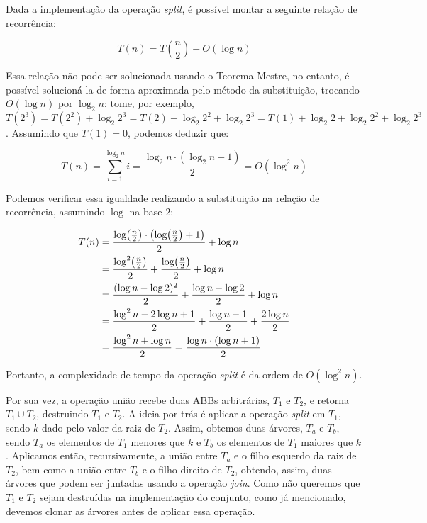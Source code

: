 \documentclass[a4paper,12pt]{report}
\begin{document}
Dada a implementação da operação \textit{split}, é possível montar a seguinte relação de recorrência:

\[
                             T(n) = T\left(\frac{n}{2}\right) + O(\log n)
\]

Essa relação não pode ser solucionada usando o Teorema Mestre, no entanto, é possível solucioná-la
de forma aproximada pelo método da substituição, trocando $O(\log n)$ por $\log_2 n$: tome, por exemplo,
$T(2^3) = T(2^2) + \log_2 2^3 = T(2) + \log_2 2^2 + \log_2 2^3 = T(1) + \log_2 2 + \log_2 2^2 + \log_2 2^3$.
Assumindo que $T(1) = 0$, podemos deduzir que:

\[
           T(n) = \sum_{i=1}^{\log_2 n} i = \frac{\log_2 n \cdot (\log_2 n + 1)}{2} = O(\log^{2} n)
\]

Podemos verificar essa igualdade realizando a substituição na relação de recorrência, assumindo 
$\log$ na base $2$:

\begin{align*}
 T(n) &= \frac{\log{\hspace{-2pt}\left(\frac{n}{2}\right)} \cdot \left(\log{\hspace{-2pt}\left(\frac{n}{2}\right)} + 1\right)}{2} + \log n \\
	  &= \frac{\log^2\hspace{-2pt}\left(\frac{n}{2}\right)}{2} + \frac{\log{\hspace{-2pt}\left(\frac{n}{2}\right)}}{2} + \log n \\
      &= \frac{(\log n - \log 2)^2}{2} + \frac{\log n - \log 2}{2} + \log n \\
      &= \frac{\log^2 n - 2\log n + 1}{2} + \frac{\log n - 1}{2} + \frac{2\log n}{2} \\
      &= \frac{\log^2 n + \log n}{2}
      = \frac{\log n \cdot \left(\log n + 1\right)}{2}
\end{align*}

Portanto, a complexidade de tempo da operação \textit{split} é da ordem de $O(\log^2 n)$.

Por sua vez, a operação união recebe duas ABBs arbitrárias, $T_1$ e $T_2$, e retorna 
$T_1 \cup T_2$, destruindo $T_1$ e $T_2$. A ideia por trás é aplicar a operação 
\textit{split} em $T_1$, sendo $k$ dado pelo valor da raiz de $T_2$. Assim, obtemos 
duas árvores, $T_a$ e $T_b$, sendo $T_a$ os elementos de $T_1$ menores que $k$ e $T_b$ 
os elementos de $T_1$ maiores que $k$. Aplicamos então, recursivamente, a união entre 
$T_a$ e o filho esquerdo da raiz de $T_2$, bem como a união entre $T_b$ e o filho direito 
de $T_2$, obtendo, assim, duas árvores que podem ser juntadas usando a operação 
\textit{join}. Como não queremos que $T_1$ e $T_2$ sejam destruídas na implementação 
do conjunto, como já mencionado, devemos clonar as árvores antes de aplicar essa operação. 
\end{document}
